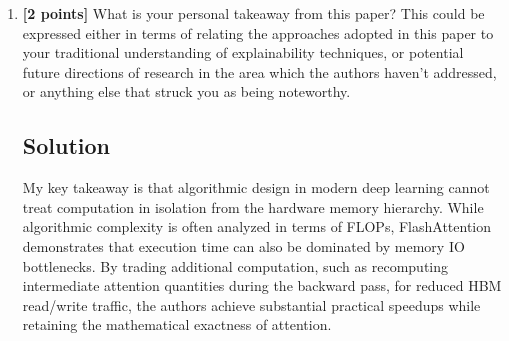 \documentclass[11pt,english]{article}
\begin{document}
\begin{enumerate}[resume]
\paragraph{Weaknesses}
\begin{itemize}[noitemsep,topsep=0pt]
    \item \textbf{Hardware Specificity:} Implementing efficient SRAM tiling requires low-level, hardware-specific kernel optimization (e.g., custom CUDA/Triton kernels), making portability across non-NVIDIA custom accelerators non-trivial.
    \item \textbf{SRAM Size Dependence:} Performance depends on available on-chip SRAM, memory bandwidth, head dimension, and tile configuration. Consequently, the performance gains vary across hardware platforms and workloads, and the implementation must select suitable tile sizes to use on-chip resources efficiently.
\end{itemize}

\newpage

\item
\textbf{[2 points]}
What is your personal takeaway from this paper? This could be expressed either in terms of relating the approaches adopted in this paper to your traditional understanding of explainability techniques, or potential future directions of research in the area which the authors haven't addressed, or anything else that struck you as being noteworthy. 

\subsection*{Solution}

My key takeaway is that algorithmic design in modern deep learning cannot treat computation in isolation from the hardware memory hierarchy. While algorithmic complexity is often analyzed in terms of FLOPs, FlashAttention demonstrates that execution time can also be dominated by memory IO bottlenecks. By trading additional computation, such as recomputing intermediate attention quantities during the backward pass, for reduced HBM read/write traffic, the authors achieve substantial practical speedups while retaining the mathematical exactness of attention.


\end{enumerate}
\end{document}
